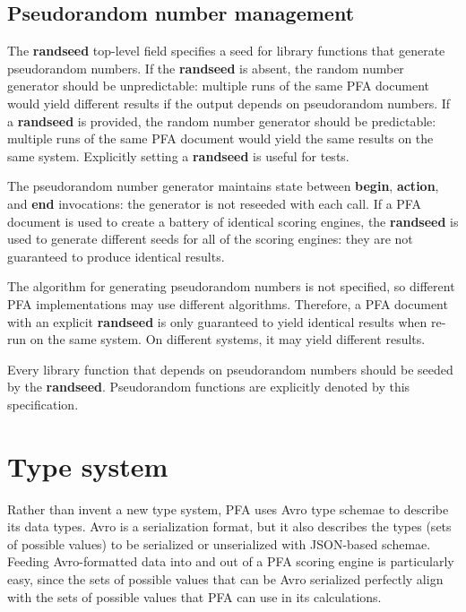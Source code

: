 \documentclass{article}
\newcommand{\PFAc}{\ttfamily\bfseries}
\theoremstyle{definition}
\begin{document}
\hypertarget{hsec:random}{}
\subsection{Pseudorandom number management}
\label{sec:random}

The {\PFAc randseed} top-level field specifies a seed for library functions that generate pseudorandom numbers.  If the {\PFAc randseed} is absent, the random number generator should be unpredictable: multiple runs of the same PFA document would yield different results if the output depends on pseudorandom numbers.  If a {\PFAc randseed} is provided, the random number generator should be predictable: multiple runs of the same PFA document would yield the same results on the same system.  Explicitly setting a {\PFAc randseed} is useful for tests.

The pseudorandom number generator maintains state between {\PFAc begin}, {\PFAc action}, and {\PFAc end} invocations: the generator is not reseeded with each call.  If a PFA document is used to create a battery of identical scoring engines, the {\PFAc randseed} is used to generate different seeds for all of the scoring engines: they are not guaranteed to produce identical results.

The algorithm for generating pseudorandom numbers is not specified, so different PFA implementations may use different algorithms.  Therefore, a PFA document with an explicit {\PFAc randseed} is only guaranteed to yield identical results when re-run on the same system.  On different systems, it may yield different results.

Every library function that depends on pseudorandom numbers should be seeded by the {\PFAc randseed}.  Pseudorandom functions are explicitly denoted by this specification.

\pagebreak

\section{Type system}

Rather than invent a new type system, PFA uses Avro type schemae to describe its data types.  Avro is a serialization format, but it also describes the types (sets of possible values) to be serialized or unserialized with JSON-based schemae.  Feeding Avro-formatted data into and out of a PFA scoring engine is particularly easy, since the sets of possible values that can be Avro serialized perfectly align with the sets of possible values that PFA can use in its calculations.
\end{document}
